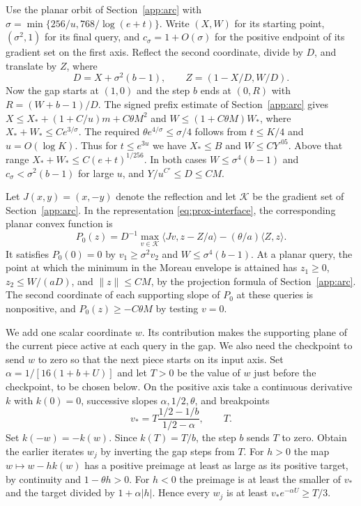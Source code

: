 \documentclass[11pt]{article}
\theoremstyle{definition}
\begin{document}
Use the planar orbit of Section~\ref{app:arc} with $\sigma=\min\{256/u,768/\log(e+t)\}$. Write $(X,W)$ for its starting point, $(\sigma^2,1)$ for its final query, and $c_\sigma=1+O(\sigma)$ for the positive endpoint of its gradient set on the first axis. Reflect the second coordinate, divide by $D$, and translate by $Z$, where
\[
 D=X+\sigma^2(b-1),\qquad Z=(1-X/D,W/D).
\]
Now the gap starts at $(1,0)$ and the step $b$ ends at $(0,R)$ with $R=(W+b-1)/D$. The signed prefix estimate of Section~\ref{app:arc} gives $X\le X_*+(1+C/u)m+C\theta M^2$ and $W\le(1+C\theta M)W_*$, where $X_*+W_*\le C e^{3/\sigma}$. The required $\theta e^{4/\sigma}\le\sigma/4$ follows from $t\le K/4$ and $u=O(\log K)$. Thus for $t\le e^{3u}$ we have $X_*\le B$ and $W\le C Y^{.05}$. Above that range $X_*+W_*\le C(e+t)^{1/256}$.
In both cases $W\le\sigma^4(b-1)$ and $c_\sigma<\sigma^2(b-1)$ for large $u$, and $Y/u^{C'}\le D\le CM$.

Let $J(x,y)=(x,-y)$ denote the reflection and let $\mathcal K$ be the gradient set of Section~\ref{app:arc}. In the representation \eqref{eq:prox-interface}, the corresponding planar convex function is
\[
 P_0(z)=D^{-1}\max_{v\in\mathcal K}\langle Jv,z-Z/a\rangle
                 -(\theta/a)\langle Z,z\rangle .
\]
It satisfies $P_0(0)=0$ by $v_1\ge\sigma^2v_2$ and $W\le\sigma^4(b-1)$. At a planar query, the point at which the minimum in the Moreau envelope
is attained has $z_1\ge0$, $z_2\le W/(aD)$, and $\|z\|\le CM$, by the projection formula of Section~\ref{app:arc}. The second coordinate of each supporting slope of $P_0$ at these queries is nonpositive, and $P_0(z)\ge-C\theta M$ by testing $v=0$.

We add one scalar coordinate $w$. Its contribution makes the supporting plane of the current piece active at each query in the gap. We also need the checkpoint to send $w$ to zero so that the next piece starts on its input axis. Set $\alpha=1/[16(1+b+U)]$ and let $T>0$ be the value of $w$ just before the checkpoint, to be chosen below. On the positive axis take a continuous derivative $k$ with $k(0)=0$, successive slopes $\alpha,1/2,\theta$, and breakpoints
\[
 v_*=T\frac{1/2-1/b}{1/2-\alpha},\qquad T.
\]
Set $k(-w)=-k(w)$. Since $k(T)=T/b$, the step $b$ sends $T$ to zero. Obtain the earlier iterates $w_j$ by inverting the gap steps from $T$. For $h>0$ the map $w\mapsto w-hk(w)$ has a positive preimage at least as large as its positive target, by continuity and $1-\theta h>0$. For $h<0$ the preimage is at least the smaller of $v_*$ and the target divided by $1+\alpha|h|$. Hence every $w_j$ is at least $v_*e^{-\alpha U}\ge T/3$.
\end{document}
